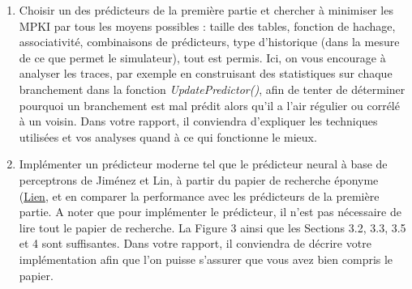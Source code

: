 \documentclass[a4paper]{article}
\begin{document}
\begin{enumerate}
	\item Choisir un des prédicteurs de la première partie et chercher à minimiser les MPKI par tous les moyens possibles : taille des tables, fonction de hachage, associativité, combinaisons de prédicteurs, type d'historique (dans la mesure de ce que permet le simulateur), tout est permis. Ici, on vous encourage à analyser les traces, par exemple en construisant des statistiques sur chaque branchement dans la fonction \textit{UpdatePredictor()}, afin de tenter de déterminer pourquoi un branchement est mal prédit alors qu'il a l'air régulier ou corrélé à un voisin. Dans votre rapport, il conviendra d'expliquer les techniques utilisées et vos analyses quand à ce qui fonctionne le mieux.
	\item Implémenter un prédicteur moderne tel que le prédicteur neural à base de perceptrons de Jiménez et Lin, à partir du papier de recherche éponyme (\href{https://www.cs.cmu.edu/afs/cs/academic/class/15740-f18/www/papers/hpca01-jiminez-perceptron.pdf}{Lien}, et en comparer la performance avec les prédicteurs de la première partie. A noter que pour implémenter le prédicteur, il n'est pas nécessaire de lire tout le papier de recherche. La Figure 3 ainsi que les Sections 3.2, 3.3, 3.5 et 4 sont suffisantes. Dans votre rapport, il conviendra de décrire votre implémentation afin que l'on puisse s'assurer que vous avez bien compris le papier.
\end{enumerate}
\end{document}
